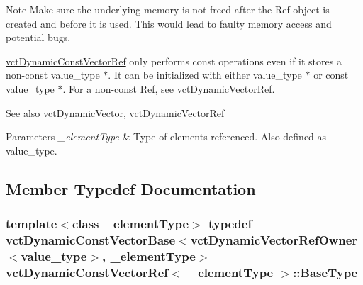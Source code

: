 \begin{DoxyNote}{Note}
Make sure the underlying memory is not freed after the Ref object is created and before it is used. This would lead to faulty memory access and potential bugs.

\hyperlink{classvct_dynamic_const_vector_ref}{vct\+Dynamic\+Const\+Vector\+Ref} only performs const operations even if it stores a non-\/const {\ttfamily value\+\_\+type $\ast$}. It can be initialized with either {\ttfamily value\+\_\+type $\ast$} or {\ttfamily const value\+\_\+type $\ast$}. For a non-\/const Ref, see \hyperlink{classvct_dynamic_vector_ref}{vct\+Dynamic\+Vector\+Ref}.
\end{DoxyNote}
\begin{DoxySeeAlso}{See also}
\hyperlink{classvct_dynamic_vector}{vct\+Dynamic\+Vector}, \hyperlink{classvct_dynamic_vector_ref}{vct\+Dynamic\+Vector\+Ref}
\end{DoxySeeAlso}

\begin{DoxyParams}{Parameters}
{\em \+\_\+element\+Type} & Type of elements referenced. Also defined as {\ttfamily value\+\_\+type}. \\
\hline
\end{DoxyParams}


\subsection{Member Typedef Documentation}
\hypertarget{classvct_dynamic_const_vector_ref_aba5f5c67feb404f0cf15c0f205625fec}{}
\subsubsection[{Base\+Type}]{\setlength{\rightskip}{0pt plus 5cm}template$<$class \+\_\+element\+Type$>$ typedef {\bf vct\+Dynamic\+Const\+Vector\+Base}$<${\bf vct\+Dynamic\+Vector\+Ref\+Owner}$<$value\+\_\+type$>$, \+\_\+element\+Type$>$ {\bf vct\+Dynamic\+Const\+Vector\+Ref}$<$ \+\_\+element\+Type $>$\+::{\bf Base\+Type}}\label{classvct_dynamic_const_vector_ref_aba5f5c67feb404f0cf15c0f205625fec}
\hypertarget{classvct_dynamic_const_vector_ref_a745d586c746244f3326ca5a07c73dea5}{}
